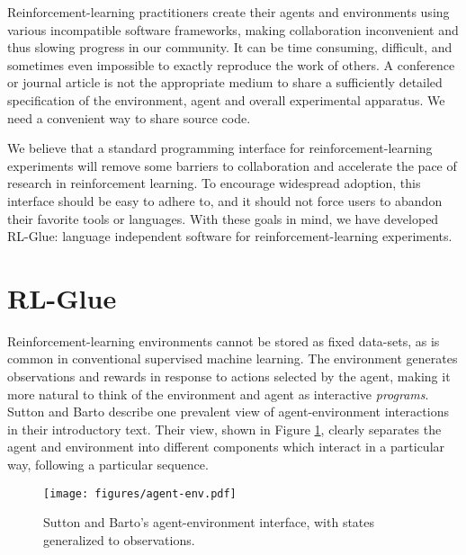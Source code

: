 \documentclass[twoside,11pt]{article}
\begin{document}
Reinforcement-learning practitioners create their agents and environments using various incompatible software frameworks, making collaboration inconvenient and thus slowing progress in our community.  It can be time consuming, difficult, and sometimes even impossible to exactly reproduce the work of others.  A conference or journal article is not the appropriate medium to share a sufficiently detailed specification of the environment, agent and overall experimental apparatus.  We need a convenient way to share source code.

We believe that a standard programming interface for reinforcement-learning experiments will remove some barriers to collaboration and accelerate the pace of research in reinforcement learning.  To encourage widespread adoption, this interface should be easy to adhere to, and it should not force users to abandon their favorite tools or languages.  With these goals in mind, we have developed RL-Glue: language independent software for reinforcement-learning experiments.


\vspace{-0.2cm}
\section{RL-Glue}
\vspace{-0.2cm}
Reinforcement-learning environments cannot be stored as fixed data-sets, as is common in conventional supervised machine learning.  The environment generates observations and rewards in response to actions selected by the agent, making it more natural to think of the environment and agent as interactive \textit{programs}.  Sutton and Barto describe one prevalent view of agent-environment interactions in their introductory text\citep{rlbook}.  Their view, shown in Figure \ref{fig:agent-env}, clearly separates the agent and environment into different components which interact in a particular way, following a particular sequence.   

\vspace{-0.4cm}
\begin{figure}[ht]
\begin{center}
\texttt{[image: figures/agent-env.pdf]}
\vspace{-0.4cm}
\caption{\small Sutton and Barto's agent-environment interface, with states generalized to observations.}
\label{fig:agent-env}
\end{center}
\vspace{-0.7cm}
\end{figure}
\end{document}
